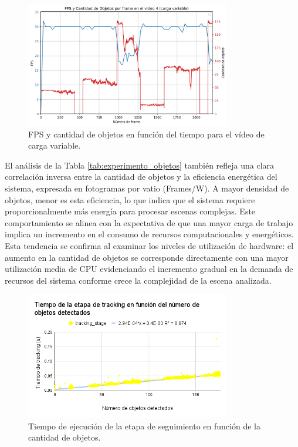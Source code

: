 \documentclass[11pt,spanish,listoffigures,listoftables]{tfgetsinf}
\begin{document}
\begin{figure}
   \centering
   \includegraphics[width=0.8\textwidth]{excels/inferencia/cantidad_objetos/resultados/variable_fps_vs_object_count/fps_vs_object_count.png}
   \caption{FPS y cantidad de objetos en función del tiempo para el vídeo de carga variable.}
   \label{fig:fps_vs_object_count}
\end{figure}

El análisis de la Tabla \ref{tab:experimento_objetos} también refleja una clara correlación inversa entre la cantidad de objetos y la eficiencia energética del sistema, expresada en fotogramas por vatio (Frames/W). A mayor densidad de objetos, menor es esta eficiencia, lo que indica que el sistema requiere proporcionalmente más energía para procesar escenas complejas. Este comportamiento se alinea con la expectativa de que una mayor carga de trabajo implica un incremento en el consumo de recursos computacionales y energéticos. Esta tendencia se confirma al examinar los niveles de utilización de hardware: el aumento en la cantidad de objetos se corresponde directamente con una mayor utilización media de CPU evidenciando el incremento gradual en la demanda de recursos del sistema conforme crece la complejidad de la escena analizada.



\begin{figure}[H]
   \centering
   \includegraphics[width=0.8\textwidth]{images/analisis_de_la_solucion/cantidad_objetos/tiempo_etapa_tracking_cantidad_objetos.png}
   \caption{Tiempo de ejecución de la etapa de seguimiento en función de la cantidad de objetos.}
   \label{fig:tiempo_etapa_tracking_cantidad_objetos}
\end{figure}
\end{document}
